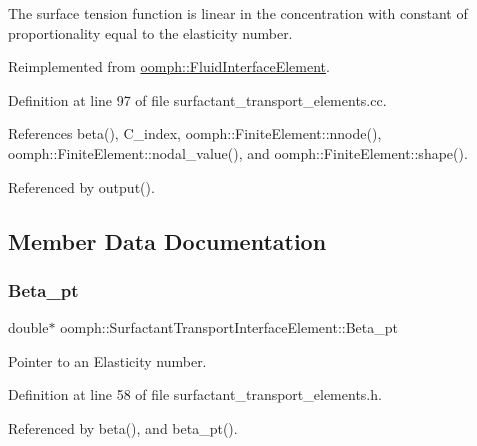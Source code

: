 The surface tension function is linear in the concentration with constant of proportionality equal to the elasticity number. 

Reimplemented from \hyperlink{classoomph_1_1FluidInterfaceElement_a7e5c3ca1eba5d4dd44c0eab9be252c2a}{oomph\+::\+Fluid\+Interface\+Element}.



Definition at line 97 of file surfactant\+\_\+transport\+\_\+elements.\+cc.



References beta(), C\+\_\+index, oomph\+::\+Finite\+Element\+::nnode(), oomph\+::\+Finite\+Element\+::nodal\+\_\+value(), and oomph\+::\+Finite\+Element\+::shape().



Referenced by output().



\subsection{Member Data Documentation}
\mbox{\label{classoomph_1_1SurfactantTransportInterfaceElement_ab5140eb5a576820321032b10a894b530}} 
\subsubsection{\texorpdfstring{Beta\+\_\+pt}{Beta\_pt}}
{\footnotesize\ttfamily double$\ast$ oomph\+::\+Surfactant\+Transport\+Interface\+Element\+::\+Beta\+\_\+pt\hspace{0.3cm}{\ttfamily [private]}}



Pointer to an Elasticity number. 



Definition at line 58 of file surfactant\+\_\+transport\+\_\+elements.\+h.



Referenced by beta(), and beta\+\_\+pt().

\mbox{\label{classoomph_1_1SurfactantTransportInterfaceElement_a26727fb7b57f88d3e1bdf4f2dd9f3b02}} 
